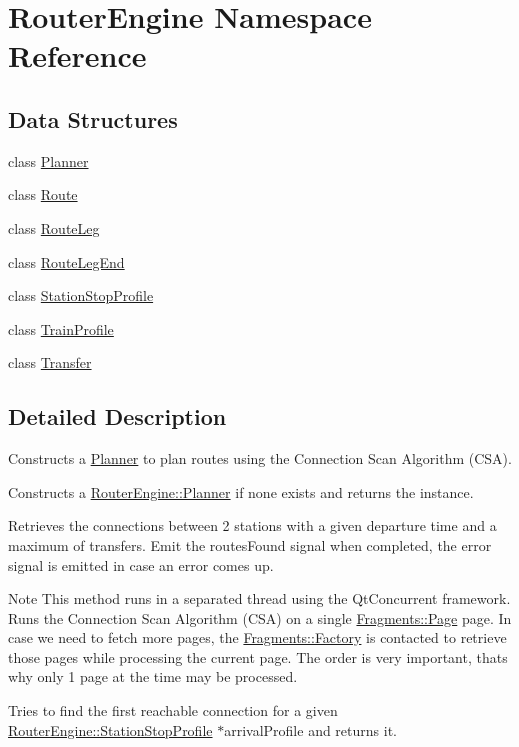 \hypertarget{namespaceRouterEngine}{}\section{Router\+Engine Namespace Reference}
\label{namespaceRouterEngine}
\subsection*{Data Structures}
\begin{DoxyCompactItemize}
\item 
class \mbox{\hyperlink{classRouterEngine_1_1Planner}{Planner}}
\item 
class \mbox{\hyperlink{classRouterEngine_1_1Route}{Route}}
\item 
class \mbox{\hyperlink{classRouterEngine_1_1RouteLeg}{Route\+Leg}}
\item 
class \mbox{\hyperlink{classRouterEngine_1_1RouteLegEnd}{Route\+Leg\+End}}
\item 
class \mbox{\hyperlink{classRouterEngine_1_1StationStopProfile}{Station\+Stop\+Profile}}
\item 
class \mbox{\hyperlink{classRouterEngine_1_1TrainProfile}{Train\+Profile}}
\item 
class \mbox{\hyperlink{classRouterEngine_1_1Transfer}{Transfer}}
\end{DoxyCompactItemize}


\subsection{Detailed Description}
Constructs a \mbox{\hyperlink{classRouterEngine_1_1Planner}{Planner}} to plan routes using the Connection Scan Algorithm (C\+SA).

Constructs a \mbox{\hyperlink{classRouterEngine_1_1Planner}{Router\+Engine\+::\+Planner}} if none exists and returns the instance.

Retrieves the connections between 2 stations with a given departure time and a maximum of transfers. Emit the routes\+Found signal when completed, the error signal is emitted in case an error comes up.

\begin{DoxyNote}{Note}
This method runs in a separated thread using the Qt\+Concurrent framework. Runs the Connection Scan Algorithm (C\+SA) on a single \mbox{\hyperlink{classFragments_1_1Page}{Fragments\+::\+Page}} page. In case we need to fetch more pages, the \mbox{\hyperlink{classFragments_1_1Factory}{Fragments\+::\+Factory}} is contacted to retrieve those pages while processing the current page. The order is very important, that\textquotesingle{}s why only 1 page at the time may be processed.
\end{DoxyNote}
Tries to find the first reachable connection for a given \mbox{\hyperlink{classRouterEngine_1_1StationStopProfile}{Router\+Engine\+::\+Station\+Stop\+Profile}} $\ast$arrival\+Profile and returns it.

